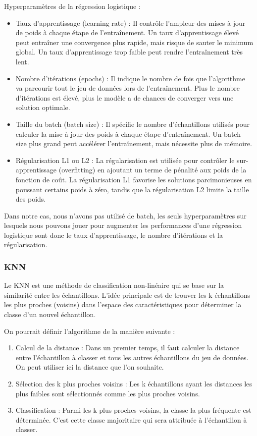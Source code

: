 Hyperparamètres de la régression logistique :
\begin{itemize}
\item Taux d'apprentissage (learning rate) : Il contrôle l'ampleur des mises à jour de poids à chaque étape de l'entraînement. Un taux d'apprentissage élevé peut entraîner une convergence plus rapide, mais risque de sauter le minimum global. Un taux d'apprentissage trop faible peut rendre l'entraînement très lent.
\item Nombre d'itérations (epochs) : Il indique le nombre de fois que l'algorithme va parcourir tout le jeu de données lors de l'entraînement. Plus le nombre d'itérations est élevé, plus le modèle a de chances de converger vers une solution optimale.
\item Taille du batch (batch size) : Il spécifie le nombre d'échantillons utilisés pour calculer la mise à jour des poids à chaque étape d'entraînement. Un batch size plus grand peut accélérer l'entraînement, mais nécessite plus de mémoire.
\item Régularisation L1 ou L2 : La régularisation est utilisée pour contrôler le sur-apprentissage (overfitting) en ajoutant un terme de pénalité aux poids de la fonction de coût. La régularisation L1 favorise les solutions parcimonieuses en poussant certains poids à zéro, tandis que la régularisation L2 limite la taille des poids.
\end{itemize}

Dans notre cas, nous n'avons pas utilisé de batch, les seuls hyperparamètres sur lesquels nous pouvons jouer pour augmenter les performances d'une régression logistique sont donc le taux d'apprentissage, le nombre d'itérations et la régularisation.

\subsubsection{KNN}

Le KNN est une méthode de classification non-linéaire qui se base sur la similarité entre les échantillons. L'idée principale est de trouver les k échantillons les plus proches (voisins) dans l'espace des caractéristiques pour déterminer la classe d'un nouvel échantillon.

On pourrait définir l'algorithme de la manière suivante :
\begin{enumerate}
\item Calcul de la distance : Dans un premier temps, il faut calculer la distance entre l'échantillon à classer et tous les autres échantillons du jeu de données. On peut utiliser ici la distance que l'on souhaite.
\item Sélection des k plus proches voisins : Les k échantillons ayant les distances les plus faibles sont sélectionnés comme les plus proches voisins.
\item Classification : Parmi les k plus proches voisins, la classe la plus fréquente est déterminée. C'est cette classe majoritaire qui sera attribuée à l'échantillon à classer.
\end{enumerate}

